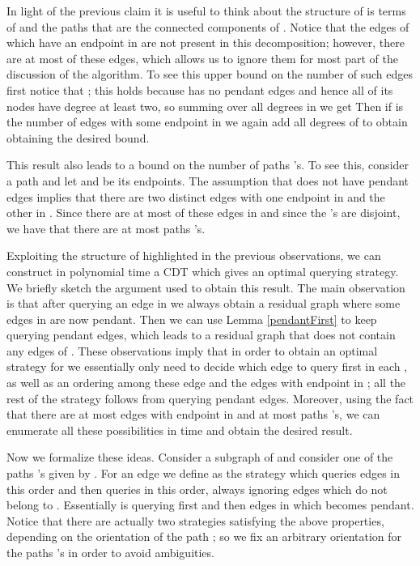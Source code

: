 \documentclass[12pt]{article}
\begin{document}
	In light of the previous claim it is useful to think about the structure of  is terms of  and the paths  that are the connected components of . Notice that the edges of  which have an endpoint in  are not present in this decomposition; however, there are at most  of these edges, which allows us to ignore them for most part of the discussion of the algorithm. To see this upper bound on the number of such edges first notice that ; this holds because  has no pendant edges and hence all of its nodes have degree at least two, so summing over all degrees in  we get	 Then if  is the number of edges with some endpoint in  we again add all degrees of  to obtain  obtaining the desired bound.
	
	This result also leads to a bound on the number of paths 's. To see this, consider a path  and let  and  be its endpoints. The assumption that  does not have pendant edges implies that there are two distinct edges with one endpoint in  and the other in . Since there are at most  of these edges in  and since the 's are disjoint, we have that there are at most  paths 's. 
	
	Exploiting the structure of  highlighted in the previous observations, we can construct in polynomial time a CDT which gives an optimal querying strategy. We briefly sketch the argument used to obtain this result. The main observation is that after querying an edge  in  we always obtain a residual graph where some edges in  are now pendant. Then we can use Lemma \ref{pendantFirst} to keep querying pendant edges, which leads to a residual graph that does not contain any edges of . These observations imply that in order to obtain an optimal strategy for  we essentially only need to decide which edge to query first in each , as well as an ordering among these edge and the edges with endpoint in ; all the rest of the strategy follows from querying pendant edges. Moreover, using the fact that there are at most  edges with endpoint in  and at most  paths 's, we can enumerate all these possibilities in time  and obtain the desired result.
	
	Now we formalize these ideas. Consider a subgraph  of  and consider one of the paths 's  given by . For an edge  we define  as the strategy which queries edges  in this order and then queries  in this order, always ignoring edges which do not belong to . Essentially  is querying  first and then edges in  which becomes pendant. Notice that there are actually two strategies satisfying the above properties, depending on the orientation of the path ; so we fix an arbitrary orientation for the paths 's in order to avoid ambiguities. 
	
\end{document}
